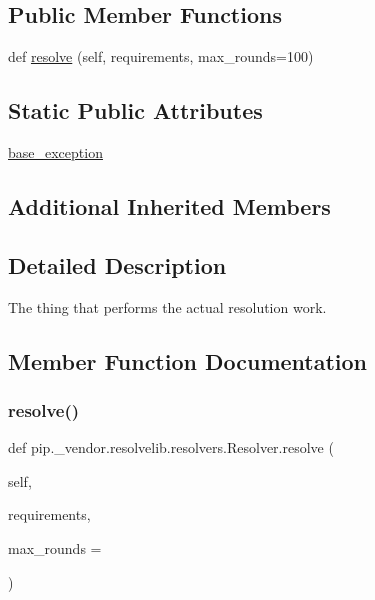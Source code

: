 \subsection*{Public Member Functions}
\begin{DoxyCompactItemize}
\item 
def \hyperlink{classpip_1_1__vendor_1_1resolvelib_1_1resolvers_1_1Resolver_ac3d279df685a65982b3d6bf3ace896da}{resolve} (self, requirements, max\+\_\+rounds=100)
\end{DoxyCompactItemize}
\subsection*{Static Public Attributes}
\begin{DoxyCompactItemize}
\item 
\hyperlink{classpip_1_1__vendor_1_1resolvelib_1_1resolvers_1_1Resolver_a608c37b1bb3d51c83b5d253b54aaa071}{base\+\_\+exception}
\end{DoxyCompactItemize}
\subsection*{Additional Inherited Members}


\subsection{Detailed Description}
\begin{DoxyVerb}The thing that performs the actual resolution work.\end{DoxyVerb}
 

\subsection{Member Function Documentation}
\mbox{\label{classpip_1_1__vendor_1_1resolvelib_1_1resolvers_1_1Resolver_ac3d279df685a65982b3d6bf3ace896da}} 
\subsubsection{\texorpdfstring{resolve()}{resolve()}}
{\footnotesize\ttfamily def pip.\+\_\+vendor.\+resolvelib.\+resolvers.\+Resolver.\+resolve (\begin{DoxyParamCaption}\item[{}]{self,  }\item[{}]{requirements,  }\item[{}]{max\+\_\+rounds = {} }\end{DoxyParamCaption})}

